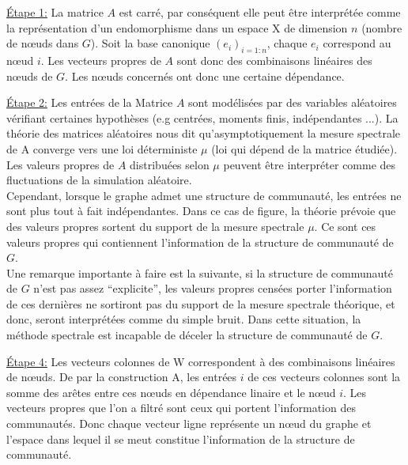 \par{\underline{Étape 1:}}
La matrice $A$ est carré, par conséquent elle peut être interprétée comme la représentation d'un endomorphisme dans un espace X de dimension $n$ (nombre de nœuds dans $G$).
Soit la base canonique $(e_i)_{i=1:n}$, chaque $e_i$ correspond au nœud $i$.
Les vecteurs propres de $A$ sont donc des combinaisons linéaires des nœuds de $G$.
Les nœuds concernés ont donc une certaine dépendance.
\par{\underline{Étape 2:}}
Les entrées de la Matrice $A$ sont modélisées par des variables aléatoires vérifiant certaines hypothèses (e.g centrées, moments finis, indépendantes ...).
La théorie des matrices aléatoires nous dit qu’asymptotiquement la mesure spectrale de A converge vers une loi déterministe $\mu$ (loi qui dépend de la matrice étudiée).
Les valeurs propres de $A$ distribuées selon $\mu$ peuvent être interpréter comme des fluctuations de la simulation aléatoire.\\
Cependant, lorsque le graphe admet une structure de communauté, les entrées ne sont plus tout à fait indépendantes.
Dans ce cas de figure, la théorie prévoie que des valeurs propres sortent du support de la mesure spectrale $\mu$.
Ce sont ces valeurs propres qui contiennent l'information de la structure de communauté de $G$.\\
Une remarque importante à faire est la suivante, si la structure de communauté de $G$ n'est pas assez ``explicite'', les valeurs propres censées porter l'information de ces dernières ne sortiront pas du support de la mesure spectrale théorique, et donc, seront interprétées comme du simple bruit.
Dans cette situation, la méthode spectrale est incapable de déceler la structure de communauté de $G$.
\par{\underline{Étape 4:}}
Les vecteurs colonnes de W correspondent à des combinaisons linéaires de nœuds.
De par la construction A, les entrées $i$ de ces vecteurs colonnes sont la somme des arêtes entre ces nœuds en dépendance linaire et le nœud $i$.
Les vecteurs propres que l'on a filtré sont ceux qui portent l'information des communautés.
Donc chaque vecteur ligne représente un nœud du graphe et l'espace dans lequel il se meut constitue l'information de la structure de communauté. 